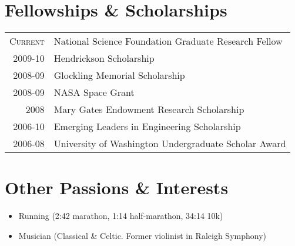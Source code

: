 \documentclass[a4paper,10pt]{article} %
\begin{document}
\section{Fellowships \& Scholarships}

\begin{table}[h]
\begin{tabular}{rl}
\textsc{Current} & National Science Foundation Graduate Research Fellow\\
\textsc{2009-10} & Hendrickson Scholarship\\
\textsc{2008-09} & Glockling Memorial Scholarship\\
\textsc{2008-09} & NASA Space Grant\\
\textsc{2008} & Mary Gates Endowment Research Scholarship\\
\textsc{2006-10} & Emerging Leaders in Engineering Scholarship\\
\textsc{2006-08} & University of Washington Undergraduate Scholar Award\\
\end{tabular}
\end{table}

\FloatBarrier


\section{Other Passions \& Interests}

\begin{itemize}
  \item Running (2:42 marathon, 1:14 half-marathon, 34:14 10k)
  \item Musician (Classical \& Celtic. Former violinist in Raleigh Symphony)
\end{itemize}

\end{document}
